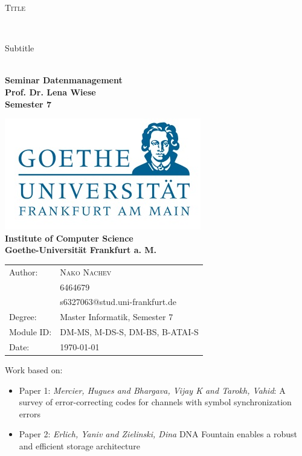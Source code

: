 \documentclass[12pt]%
{article}
\begin{document}
\begin{titlepage}

\begin{center}

{\Huge %
 
{%
\textsc{Title}}}
\\[2ex]

{\large %

{Subtitle}}\\[0.5cm]


\textbf{
\Large Seminar Datenmanagement\\ 
Prof. Dr. Lena Wiese \\ 
Semester 7
}

\includegraphics[scale=0.4]{logo.jpg} \\ 
\large{\textbf{Institute of Computer Science \\ Goethe-Universit\"at Frankfurt a. M.}}



\begin{Large}
\begin{tabular}{ll}
Author: & \textsc{Nako Nachev} \\
& 6464679\\
& s6327063@stud.uni-frankfurt.de \\
Degree:&  Master Informatik, Semester 7 \\
Module ID: & DM-MS, M-DS-S, DM-BS, B-ATAI-S \\
Date: & \today \\		
\end{tabular}
\end{Large}

\end{center}

\vspace*{\fill}

\large
\noindent{}Work based on: \\
\begin{itemize}
\item Paper 1: \emph{Mercier, Hugues and Bhargava, Vijay K and Tarokh, Vahid}: A survey of error-correcting codes for channels with symbol synchronization errors
\item Paper 2: \emph{Erlich, Yaniv and Zielinski, Dina} DNA Fountain enables a robust and efficient storage architecture
\end{itemize}


\end{titlepage}
\end{document}
